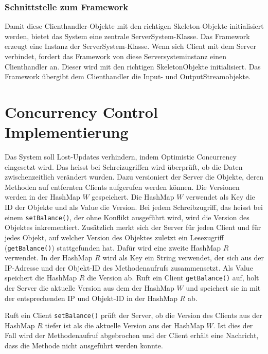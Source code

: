 \subsubsection{Schnittstelle zum Framework}
\label{sec:schn-zum-fram}

Damit diese Clienthandler-Objekte mit den
richtigen Skeleton-Objekte initialisiert werden, bietet das System
eine zentrale ServerSystem-Klasse. Das Framework erzeugt eine Instanz
der ServerSystem-Klasse. Wenn sich Client mit dem Server verbindet,
fordert das Framework von diese Serversystem\-instanz einen
Clienthandler an. Dieser wird mit den richtigen SkeletonObjekte
initialisiert. Das Framework übergibt dem Clienthandler die Input- und OutputStreamobjekte.

\section{Concurrency Control Implementierung }
\label{sec:conc-contr-impl}

Das System soll Lost-Updates verhindern, indem Optimistic Concurrency
eingesetzt wird. Das heisst bei Schreizugriffen wird überprüft, ob die Daten zwischenzeitlich verändert wurden. Dazu
versioniert der Server die Objekte, deren Methoden auf entfernten
Clients aufgerufen werden können. Die Versionen werden in der HashMap
$W$ gespeichert. Die HashMap $W$ verwendet als Key die ID der Objekte
und als Value die Version. Bei jedem Schreibzugriff, das heisst bei
einem \verb|setBalance()|, der ohne Konflikt ausgeführt wird, wird die
Version des Objektes inkrementiert. Zusätzlich merkt sich der Server
für jeden Client und für jedes Objekt, auf welcher Version des
Objektes zuletzt ein Lesezugriff (\verb|getBalance()|) stattgefunden hat. Dafür
wird eine zweite HashMap $R$ verwendet. In der HashMap $R$ wird als Key
ein String verwendet, der sich aus der IP-Adresse und der
Objekt-ID des Methodenaufrufs zusammensetzt. Als Value speichert die HashMap $R$ die Version ab.
Ruft ein Client
\verb|getBalance()| auf, holt der Server die aktuelle Version aus dem
der HashMap $W$ und speichert sie in mit der entsprechenden IP und
Objekt-ID in der HashMap $R$ ab.

Ruft ein Client \verb|setBalance()| prüft der Server, ob die
Version des Clients aus der HashMap $R$ tiefer ist als die aktuelle
Version aus der HashMap $W$. Ist dies der Fall wird der Methodenaufruf
abgebrochen und der Client erhält eine Nachricht, dass die Methode
nicht ausgeführt werden konnte.